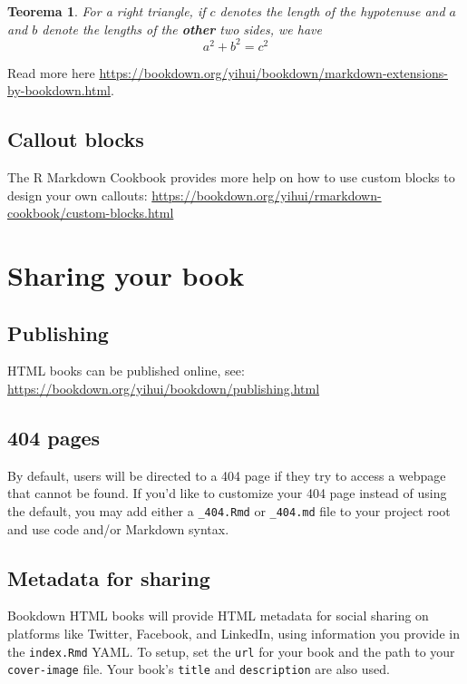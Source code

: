 \documentclass[
]{book}
\newtheorem{theorem}{Teorema}[chapter]
\theoremstyle{definition}
\theoremstyle{definition}
\theoremstyle{definition}
\theoremstyle{definition}
\theoremstyle{remark}
\begin{document}
\begin{theorem}
\protect\hypertarget{thm:tri}{}\label{thm:tri}For a right triangle, if \(c\) denotes the \emph{length} of the hypotenuse
and \(a\) and \(b\) denote the lengths of the \textbf{other} two sides, we have
\[a^2 + b^2 = c^2\]
\end{theorem}

Read more here \url{https://bookdown.org/yihui/bookdown/markdown-extensions-by-bookdown.html}.

\hypertarget{callout-blocks}{%
\section{Callout blocks}\label{callout-blocks}}

The R Markdown Cookbook provides more help on how to use custom blocks to design your own callouts: \url{https://bookdown.org/yihui/rmarkdown-cookbook/custom-blocks.html}

\hypertarget{sharing-your-book}{%
\chapter{Sharing your book}\label{sharing-your-book}}

\hypertarget{publishing}{%
\section{Publishing}\label{publishing}}

HTML books can be published online, see: \url{https://bookdown.org/yihui/bookdown/publishing.html}

\hypertarget{pages}{%
\section{404 pages}\label{pages}}

By default, users will be directed to a 404 page if they try to access a webpage that cannot be found. If you'd like to customize your 404 page instead of using the default, you may add either a \texttt{\_404.Rmd} or \texttt{\_404.md} file to your project root and use code and/or Markdown syntax.

\hypertarget{metadata-for-sharing}{%
\section{Metadata for sharing}\label{metadata-for-sharing}}

Bookdown HTML books will provide HTML metadata for social sharing on platforms like Twitter, Facebook, and LinkedIn, using information you provide in the \texttt{index.Rmd} YAML. To setup, set the \texttt{url} for your book and the path to your \texttt{cover-image} file. Your book's \texttt{title} and \texttt{description} are also used.
\end{document}
